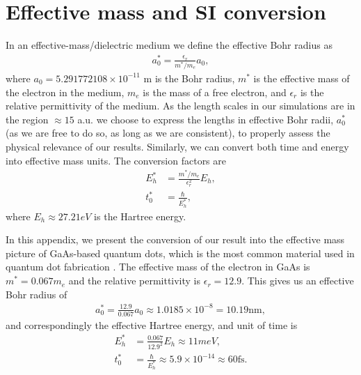 \documentclass{subfiles}
\begin{document}
\section{Effective mass and SI conversion}\label{app:appendix_A}
In an effective-mass/dielectric medium we define the effective Bohr radius as
\begin{align}
    a_0^* = \frac{\epsilon_r}{m^*/m_e}a_0,
\end{align}
where $a_0=5.291772108 \times 10^{-11}$ m is the Bohr radius, $m^*$ is the effective mass of the electron in the medium, $m_e$ is the mass of a free electron, and $\epsilon_r$ is the relative permittivity of the medium. As the length scales in our simulations are in the region $\approx 15$ a.u. we choose to express the lengths in effective Bohr radii, $a_0^*$ (as we are free to do so, as long as we are consistent), to properly assess the physical relevance of our results. 
Similarly, we can convert both time and energy into effective mass units. The conversion factors are
\begin{align*}
    E_h^* &= \frac{m^*/m_e}{\epsilon_r^2}E_h, \\
    t_0^* &= \frac{\hbar}{E_h^*},
\end{align*}
where $E_h \approx 27.21 eV$ is the Hartree energy.

In this appendix, we present the conversion of our result into the effective mass picture of GaAs-based quantum dots, which is the most common material used in quantum dot fabrication \cite{jacak2013quantum, garcia2021semiconductor}. The effective mass of the electron in GaAs is $m^* = 0.067 m_e$ and the relative permittivity is $\epsilon_r = 12.9$. This gives us an effective Bohr radius of
\begin{align}
    a_0^* = \frac{12.9}{0.067}a_0 \approx 1.0185\times10^{-8} = 10.19 \text{nm},
\end{align}
and correspondingly the effective Hartree energy, and unit of time is
\begin{align*}
    E_h^* &= \frac{0.067}{12.9^2}E_h \approx 11meV, \\
    t_0^* &= \frac{\hbar}{E_h^*} \approx 5.9\times10^{-14} \approx 60 \text{fs}. 
\end{align*}
\end{document}
